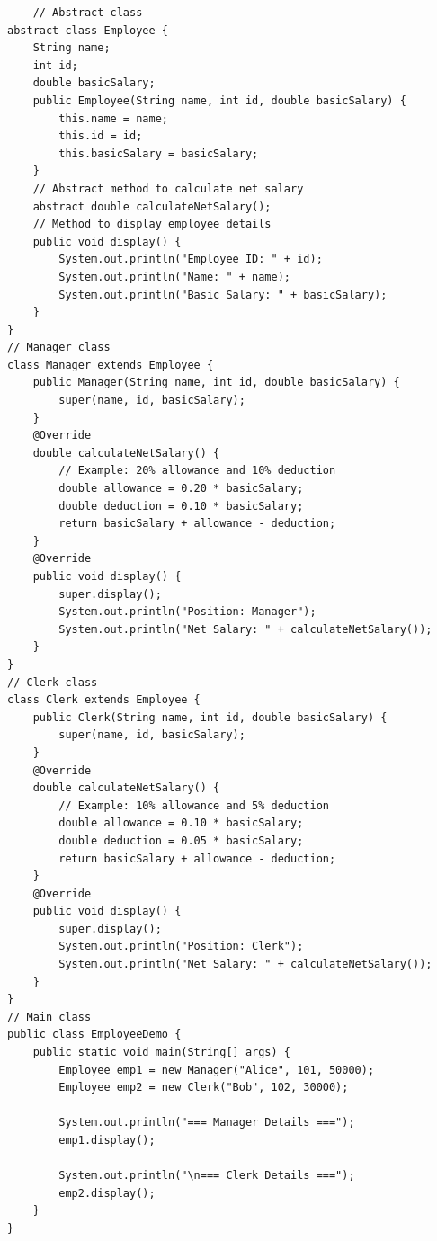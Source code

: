 \begin{verbatim}
    // Abstract class
abstract class Employee {
    String name;
    int id;
    double basicSalary;
    public Employee(String name, int id, double basicSalary) {
        this.name = name;
        this.id = id;
        this.basicSalary = basicSalary;
    }
    // Abstract method to calculate net salary
    abstract double calculateNetSalary();
    // Method to display employee details
    public void display() {
        System.out.println("Employee ID: " + id);
        System.out.println("Name: " + name);
        System.out.println("Basic Salary: " + basicSalary);
    }
}
// Manager class
class Manager extends Employee {
    public Manager(String name, int id, double basicSalary) {
        super(name, id, basicSalary);
    }
    @Override
    double calculateNetSalary() {
        // Example: 20% allowance and 10% deduction
        double allowance = 0.20 * basicSalary;
        double deduction = 0.10 * basicSalary;
        return basicSalary + allowance - deduction;
    }
    @Override
    public void display() {
        super.display();
        System.out.println("Position: Manager");
        System.out.println("Net Salary: " + calculateNetSalary());
    }
}
// Clerk class
class Clerk extends Employee {
    public Clerk(String name, int id, double basicSalary) {
        super(name, id, basicSalary);
    }
    @Override
    double calculateNetSalary() {
        // Example: 10% allowance and 5% deduction
        double allowance = 0.10 * basicSalary;
        double deduction = 0.05 * basicSalary;
        return basicSalary + allowance - deduction;
    }
    @Override
    public void display() {
        super.display();
        System.out.println("Position: Clerk");
        System.out.println("Net Salary: " + calculateNetSalary());
    }
}
// Main class
public class EmployeeDemo {
    public static void main(String[] args) {
        Employee emp1 = new Manager("Alice", 101, 50000);
        Employee emp2 = new Clerk("Bob", 102, 30000);

        System.out.println("=== Manager Details ===");
        emp1.display();

        System.out.println("\n=== Clerk Details ===");
        emp2.display();
    }
}
\end{verbatim}
